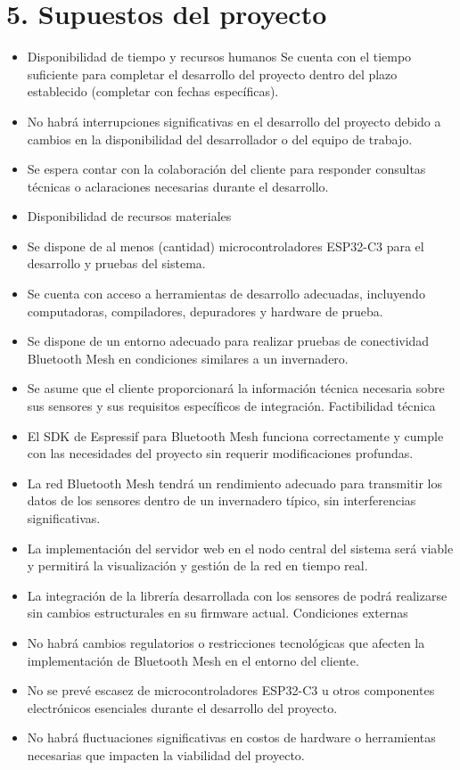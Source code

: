 \documentclass[
11pt, %
]{charter}
\begin{document}
\section{5. Supuestos del proyecto}
\label{sec:supuestos}

\begin{itemize}
\item Disponibilidad de tiempo y recursos humanos
Se cuenta con el tiempo suficiente para completar el desarrollo del proyecto dentro del plazo establecido (completar con fechas específicas).
\item No habrá interrupciones significativas en el desarrollo del proyecto debido a cambios en la disponibilidad del desarrollador o del equipo de trabajo.
\item Se espera contar con la colaboración del cliente para responder consultas técnicas o aclaraciones necesarias durante el desarrollo.
\item Disponibilidad de recursos materiales
\item Se dispone de al menos (cantidad) microcontroladores ESP32-C3 para el desarrollo y pruebas del sistema.
\item Se cuenta con acceso a herramientas de desarrollo adecuadas, incluyendo computadoras, compiladores, depuradores y hardware de prueba.
\item Se dispone de un entorno adecuado para realizar pruebas de conectividad Bluetooth Mesh en condiciones similares a un invernadero.
\item Se asume que el cliente proporcionará la información técnica necesaria sobre sus sensores y sus requisitos específicos de integración.
Factibilidad técnica
\item El SDK de Espressif para Bluetooth Mesh funciona correctamente y cumple con las necesidades del proyecto sin requerir modificaciones profundas.
\item La red Bluetooth Mesh tendrá un rendimiento adecuado para transmitir los datos de los sensores dentro de un invernadero típico, sin interferencias significativas.
\item La implementación del servidor web en el nodo central del sistema será viable y permitirá la visualización y gestión de la red en tiempo real.
\item La integración de la librería desarrollada con los sensores de {\empclientename} podrá realizarse sin cambios estructurales en su firmware actual.
Condiciones externas
\item No habrá cambios regulatorios o restricciones tecnológicas que afecten la implementación de Bluetooth Mesh en el entorno del cliente.
\item No se prevé escasez de microcontroladores ESP32-C3 u otros componentes electrónicos esenciales durante el desarrollo del proyecto.
\item No habrá fluctuaciones significativas en costos de hardware o herramientas necesarias que impacten la viabilidad del proyecto.
\end{itemize}
\end{document}
